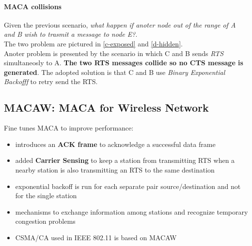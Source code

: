 \documentclass[10pt,a4paper]{report}
\theoremstyle{definition}
\begin{document}
\paragraph{MACA collisions}\label{sec:maca-collisions}
Given the previous scenario, \textit{what happen if anoter node out of the range of A and B wish to trasmit a message to node E?}.\\
The two problem are pictured in \ref{c-exposed} and \ref{d-hidden}.\\ Anoter problem is presented by the scenario in which C and B sends \textit{RTS} simultaneosly to A. \textbf{The two RTS messages collide so no CTS message is generated}. The adopted solution is that C and B use \textit{Binary Exponential Backofff} to retry send the RTS.

\subsection{MACAW: MACA for Wireless Network}\label{sec:macaw-maca-for-wireless-network}
Fine tunes MACA to improve performance:
\begin{itemize}
	\item 
	introduces an \textbf{ACK frame} to acknowledge a successful data frame
	\item 
	added \textbf{Carrier Sensing} to keep a station from transmitting RTS when a nearby station is also transmitting an RTS to the same destination
	\item 
	exponential backoff is run for each separate pair source/destination and not for the single station
	\item 
	mechanisms to exchange information among stations and recognize temporary congestion problems
	\item 
	CSMA/CA used in IEEE 802.11 is based on MACAW
\end{itemize}
\end{document}
